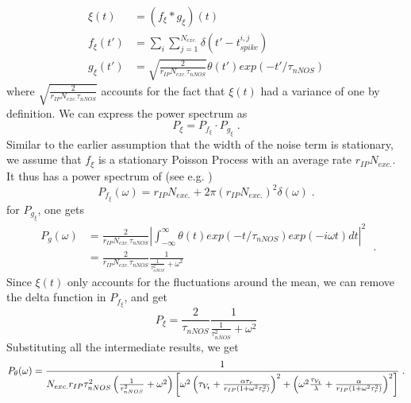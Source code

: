 \documentclass[10pt,a4paper]{article}
\begin{document}
\begin{align}
\xi (t) &= \left(f_\xi \ast g_\xi \right)(t) \label{Noise_Pow_Spec_Conv2_1} \\
f_\xi (t') &= \sum_i \sum_{j=1}^{N_{exc.}} \delta(t' - t^{i,j}_{spike}) \label{Noise_Pow_Spec_Conv2_2} \\
g_\xi (t') &= \sqrt{\frac{2}{r_{IP}N_{exc.}\tau_{nNOS}}} \theta(t') exp(-t'/\tau_{nNOS}) \label{Noise_Pow_Spec_Conv2_3}
\end{align}
where $\sqrt{\frac{2}{r_{IP}N_{exc.}\tau_{nNOS}}}$ accounts for the fact that $\xi(t)$ had a variance of one by definition. We can express the power spectrum as
\begin{equation}
P_{\xi} = P_{f_\xi} \cdot P_{g_\xi} \;. \label{Noise_Pow_Spec_Conv2}
\end{equation}
Similar to the earlier assumption that the width of the noise term is stationary, we assume that $f_\xi$ is a stationary Poisson Process with an average rate $r_{IP}N_{exc.}$. It thus has a power spectrum of (see e.g. \cite[p. 162]{Spiking_Gerstner})
\begin{equation}
P_{f_\xi} (\omega) = r_{IP}N_{exc.} + 2\pi (r_{IP}N_{exc.})^2 \delta(\omega) \; . \label{Pow_Spec_Poisson}
\end{equation}
for $P_{g_\xi}$, one gets
\begin{equation}
\begin{split}
P_g(\omega) &= \frac{2}{r_{IP}N_{exc.}\tau_{nNOS}}  \left| \int_{-\infty}^{\infty} \theta(t) exp(-t/\tau_{nNOS}) exp(-i\omega t) dt \right|^2\\
 &= \frac{2}{r_{IP}N_{exc.}\tau_{nNOS}} \frac{1}{\frac{1}{\tau_{nNOS}^2} + \omega^2}
 \end{split} \;. \label{Pow_Spec_Exponential_Kernel}
\end{equation}
Since $\xi(t)$ only accounts for the fluctuations around the mean, we can remove the delta function in $P_{f_\xi}$, and get
\begin{equation}
P_{\xi} = \frac{2}{\tau_{nNOS}} \frac{1}{\frac{1}{\tau_{nNOS}^2} + \omega^2}
\end{equation}
Substituting all the intermediate results, we get
\begin{equation}
\small
P_\theta(\omega) = \frac{1}{N_{exc.}r_{IP}\tau_{nNOS}^2 \left( \frac{1}{\tau_{nNOS}^2} +\omega^2 \right)\left[ \omega^2 \left( \tau_{V_t} + \frac{\alpha \tau_r}{r_{IP}(1+\omega^2\tau_r^2)}\right)^2 + \left( \omega^2 \frac{\tau_{V_t}}{\lambda} + \frac{\alpha}{r_{IP}(1+\omega^2\tau_r^2)} \right)^2 \right] } \; .\label{Pow_Spec_Theta_Final}
\normalsize
\end{equation}
\end{document}
